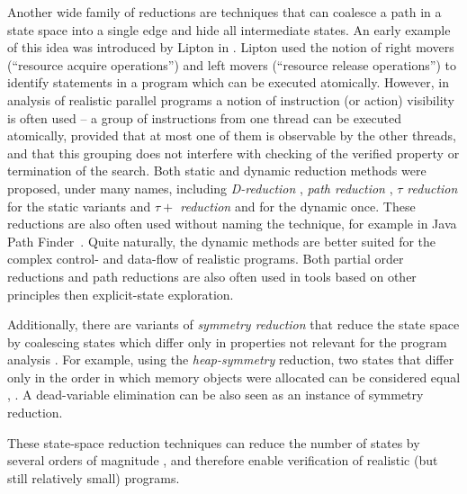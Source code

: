 Another wide family of reductions are techniques that can coalesce a path in a
state space into a single edge and hide all intermediate states.
An early example of this idea was introduced by Lipton in .
Lipton used the notion of right movers (``resource acquire operations'') and
left movers (``resource release operations'') to identify statements in a
program which can be executed atomically.
However, in analysis of realistic parallel programs a notion of instruction (or
action) visibility is often used -- a group of instructions from one thread can
be executed atomically, provided that at most one of them is observable by the
other threads, and that this grouping does not interfere with checking of the
verified property or termination of the search.
Both static and dynamic reduction methods were proposed, under many names,
including \emph{D-reduction} , \emph{path reduction}
, \emph{$\tau$ reduction}  for the static
variants and \emph{$\tau+$ reduction}  and  for the dynamic once.
These reductions are also often used without naming the technique, for example in
Java Path Finder~.
Quite naturally, the dynamic methods are better suited for the complex control-
and data-flow of realistic programs.
Both partial order reductions and path reductions are also often used in tools
based on other principles then explicit-state exploration.

Additionally, there are variants of \emph{symmetry reduction} that reduce the
state space by coalescing states which differ only in properties not relevant
for the program analysis \cite{Clarke1998}.
For example, using the \emph{heap-symmetry} reduction, two states that differ
only in the order in which memory objects were allocated can be considered
equal , .
A dead-variable elimination  can be also seen as an instance
of symmetry reduction.

These state-space reduction techniques can reduce the number of states by
several orders of magnitude , and therefore enable verification of
realistic (but still relatively small) programs.

